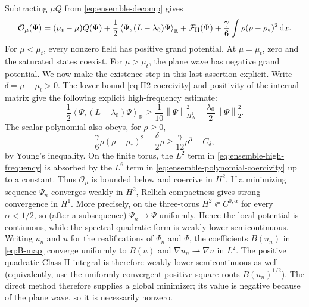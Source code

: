 \documentclass[11pt]{article}
\numberwithin{equation}{section}
\theoremstyle{definition}
\newcommand{\R}{\mathbb R}
\newcommand{\cF}{\mathcal F}
\newcommand{\cO}{\mathcal O}
\newcommand{\dd}{\,\mathrm d}
\newcommand{\norm}[1]{\left\lVert#1\right\rVert}
\newcommand{\ip}[2]{\left\langle #1,#2\right\rangle}
\begin{document}
Subtracting $\mu Q$ from \eqref{eq:ensemble-decomp} gives
\begin{equation}
 \cO_\mu(\Psi)=(\mu_t-\mu)Q(\Psi)
 +\frac12\ip{\Psi}{(L-\lambda_0)\Psi}_{\R}
 +\cF_{\rm II}(\Psi)
 +\frac\gamma6\int\rho(\rho-\rho_*)^2\dd x.
 \label{eq:grand-decomp}
\end{equation}
For $\mu<\mu_t$, every nonzero field has positive grand potential.  At
$\mu=\mu_t$, zero and the saturated states coexist.  For $\mu>\mu_t$, the
plane wave has negative grand potential.  We now make the existence step in
this last assertion explicit.  Write $\delta=\mu-\mu_t>0$.  The lower bound
\eqref{eq:H2-coercivity} and positivity of the internal matrix give the
following explicit high-frequency estimate:
\begin{equation}
 \frac12\ip{\Psi}{(L-\lambda_0)\Psi}_{\R}
 \ge \frac1{10}\norm{\Psi}_{H^2_\Delta}^2
       -\frac{\lambda_0}{2}\norm{\Psi}_2^2.
 \label{eq:ensemble-high-frequency}
\end{equation}
The scalar polynomial also obeys, for $\rho\ge0$,
\begin{equation}
 \frac\gamma6\rho(\rho-\rho_*)^2-
 \frac\delta2\rho\ge \frac\gamma{12}\rho^3-C_\delta,
 \label{eq:ensemble-polynomial-coercivity}
\end{equation}
by Young's inequality.  On the finite torus, the $L^2$ term in
\eqref{eq:ensemble-high-frequency} is absorbed by the $L^6$ term in
\eqref{eq:ensemble-polynomial-coercivity} up to a constant.  Thus
$\cO_\mu$ is bounded below and coercive in $H^2$.  If a minimizing sequence
$\Psi_n$ converges weakly in $H^2$, Rellich compactness gives strong
convergence in $H^1$.  More precisely, on the three-torus
$H^2\Subset C^{0,\alpha}$ for every $\alpha<1/2$, so (after a subsequence)
$\Psi_n\to\Psi$ uniformly.  Hence the local potential is continuous, while
the spectral quadratic form is weakly lower semicontinuous.  Writing $u_n$ and $u$ for the realifications of
$\Psi_n$ and $\Psi$, the coefficients $B(u_n)$ in \eqref{eq:B-map}
converge uniformly to $B(u)$ and $\nabla u_n\rightharpoonup\nabla u$
in $L^2$.  The positive quadratic Class-II integral is therefore weakly lower
semicontinuous as well (equivalently, use the uniformly convergent positive
square roots $B(u_n)^{1/2}$).  The direct method therefore supplies a global
minimizer; its value is negative because of the plane wave, so it is
necessarily nonzero.
\end{document}
